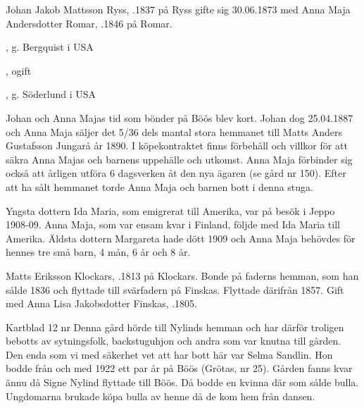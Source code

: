 Johan Jakob Mattsson Ryss, .1837 på Ryss gifte sig 30.06.1873 med Anna Maja Andersdotter Romar, .1846 på Romar.
\begin{jhchildren}
  \item {}
  \item {}, g. Bergquist i USA
  \item {}, ogift
  \item {}
  \item {}
  \item {}, g. Söderlund i USA
\end{jhchildren}
Johan och Anna Majas tid som bönder på Böös blev kort. Johan dog 25.04.1887 och Anna Maja säljer det 5/36 dels mantal stora hemmanet till Matts Anders Gustafsson Jungarå år 1890. I köpekontraktet finns förbehåll och villkor för att säkra Anna Majas och barnens uppehälle och utkomst. Anna Maja förbinder sig också att årligen utföra 6 dagsverken åt den nya ägaren (se gård nr 150). Efter att ha sålt hemmanet torde Anna Maja och barnen bott i denna stuga.

Yngsta dottern Ida Maria, som emigrerat till Amerika, var på besök i Jeppo 1908-09. Anna Maja, som var ensam kvar i Finland, följde med 	Ida Maria till Amerika. Äldsta dottern Margareta hade dött 1909 och Anna Maja behövdes för hennes tre små barn, 4 mån, 6 år och 8 år.


Matts Eriksson Klockars, .1813 på Klockars. Bonde på faderns hemman, som han sålde 1836 och flyttade till svärfadern på Finskas. Flyttade därifrån 1857. Gift med Anna Lisa Jakobsdotter Finskas, .1805.
\begin{jhchildren}
  \item {}
  \item {}
  \item {}
\end{jhchildren}


Kartblad 12   nr 
Denna gård hörde till Nylinds hemman och har därför troligen bebotts av sytningsfolk, backstuguhjon och andra som var knutna till gården. Den enda som vi med säkerhet vet att har bott här var Selma Sandlin. Hon bodde från och med 1922 ett par år på Böös (Grötas, nr 25). Gården fanns kvar ännu då Signe Nylind flyttade till Böös. Då bodde en kvinna där som sålde bulla. Ungdomarna brukade köpa bulla av henne då de kom hem från dansen.

